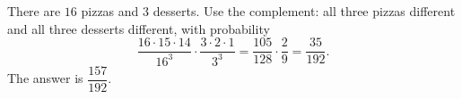 There are $16$ pizzas and $3$ desserts. Use the complement: all three pizzas different and all three desserts different, with probability
\[\dfrac{16\cdot15\cdot14}{16^3}\cdot\dfrac{3\cdot2\cdot1}{3^3}=\dfrac{105}{128}\cdot\dfrac29=\dfrac{35}{192}.\]
The answer is $\boxed{\dfrac{157}{192}}$.
